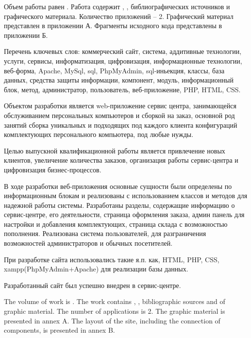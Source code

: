 
Объем работы равен . Работа содержит , ,  библиографических источников и  графического материала. Количество приложений – 2. Графический материал представлен в приложении А. Фрагменты исходного кода представлены в приложении Б.

Перечень ключевых слов: коммерческий сайт, система, аддитивные технологии, услуги, сервисы, информатизация, цифровизация, информационные технологии, веб-форма,  Apache, MySql, sql, PhpMyAdmin, sql-иньекция, классы, база данных, средства защиты информации, компонент, модуль, информационный блок, метод,  администратор, пользователь, веб-приложение, PHP, HTML, CSS.

Объектом разработки является web-приложение сервис центра,  занимающейся обслуживанием персональных компьютеров и сборкой на заказ, основной род занятий сборка уникальных и подходящих под каждого клиента конфигураций комплектующих персонального компьютера, под любые нужды.

Целью выпускной квалификационной работы является привлечение новых клиентов, увеличение количества заказов, организация работы сервис-центра и цифровизация бизнес-процессов.

В ходе разработки веб-приложения основные сущности были определены по информационным блокам и реализованы с использованием классов и методов для надежной работы системы. Разработаны разделы, содержащие информацию о сервис-центре, его деятельности, страница оформления заказа, админ панель для настройки и добавления комплектующих, страница склада с возможностью пополнения. Реализована система пользователей, для разграничения возможностей администраторов и обычных посетителей.

При разработке сайта использовались такие я.п. как, HTML, PHP, CSS, xampp(PhpMyAdmin+Apache) для реализации базы данных.

Разработанный сайт был успешно внедрен в сервис-центре.

  
The volume of work is . The work contains , ,  bibliographic sources and  of graphic material. The number of applications is 2. The graphic material is presented in annex A. The layout of the site, including the connection of components, is presented in annex B.

